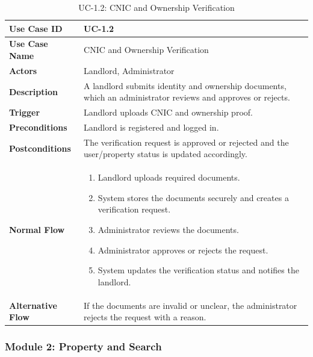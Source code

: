 \begin{table}[h]
\centering
\caption{UC-1.2: CNIC and Ownership Verification}

\begin{tabularx}{\textwidth}{
|>{\raggedright\arraybackslash}p{3.5cm}
|>{\raggedright\arraybackslash}X|}

\hline
\textbf{Use Case ID} & UC-1.2 \\ \hline
\textbf{Use Case Name} & CNIC and Ownership Verification \\ \hline
\textbf{Actors} & Landlord, Administrator \\ \hline
\textbf{Description} & A landlord submits identity and ownership documents, which an administrator reviews and approves or rejects. \\ \hline
\textbf{Trigger} & Landlord uploads CNIC and ownership proof. \\ \hline
\textbf{Preconditions} & Landlord is registered and logged in. \\ \hline
\textbf{Postconditions} & The verification request is approved or rejected and the user/property status is updated accordingly. \\ \hline
\textbf{Normal Flow} &
\begin{enumerate}
    \item Landlord uploads required documents.
    \item System stores the documents securely and creates a verification request.
    \item Administrator reviews the documents.
    \item Administrator approves or rejects the request.
    \item System updates the verification status and notifies the landlord.
\end{enumerate}
\\ \hline
\textbf{Alternative Flow} &
If the documents are invalid or unclear, the administrator rejects the request with a reason.
\\ \hline

\end{tabularx}

\end{table}

\subsubsection{Module 2: Property and Search}

